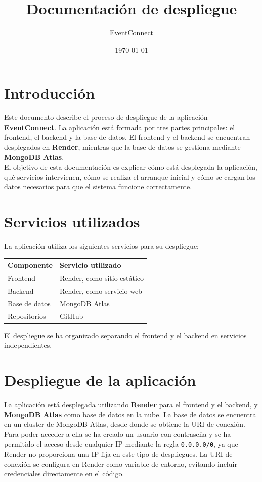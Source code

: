 \documentclass[12pt,a4paper]{article}
\title{Documentación de despliegue}
\author{EventConnect}
\date{\today}
\begin{document}
\maketitle

\section{Introducción}

\noindent
Este documento describe el proceso de despliegue de la aplicación \textbf{EventConnect}.
La aplicación está formada por tres partes principales: el frontend, el backend y la
base de datos. El frontend y el backend se encuentran desplegados en \textbf{Render},
mientras que la base de datos se gestiona mediante \textbf{MongoDB Atlas}. \\

\noindent
El objetivo de esta documentación es explicar cómo está desplegada la aplicación, qué
servicios intervienen, cómo se realiza el arranque inicial y cómo se cargan los datos
necesarios para que el sistema funcione correctamente.

\section{Servicios utilizados}

La aplicación utiliza los siguientes servicios para su despliegue:

\begin{center}
\begin{tabular}{ll}
  \toprule
  \textbf{Componente} & \textbf{Servicio utilizado} \\
  \midrule
  Frontend & Render, como sitio estático \\
  Backend & Render, como servicio web \\
  Base de datos & MongoDB Atlas \\
  Repositorios & GitHub \\
  \bottomrule
\end{tabular}
\end{center}

\noindent
El despliegue se ha organizado separando el frontend y el backend en servicios
independientes.
\section{Despliegue de la aplicación}

\noindent
La aplicación está desplegada utilizando \textbf{Render} para el frontend y el backend,
y \textbf{MongoDB Atlas} como base de datos en la nube. La base de datos se encuentra
en un cluster de MongoDB Atlas, desde donde se obtiene la URI de conexión. Para poder
acceder a ella se ha creado un usuario con contraseña y se ha permitido el acceso desde
cualquier IP mediante la regla \texttt{0.0.0.0/0}, ya que Render no proporciona una IP
fija en este tipo de despliegues. La URI de conexión se configura en Render como
variable de entorno, evitando incluir credenciales directamente en el código. \\
\end{document}
